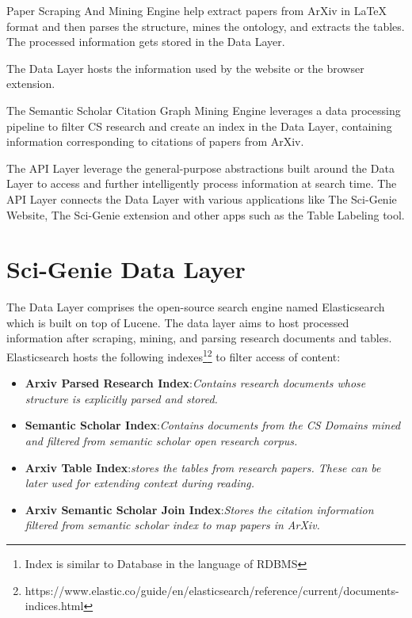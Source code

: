 Paper Scraping And Mining Engine help extract papers from ArXiv in LaTeX format and then parses the structure, mines the ontology, and extracts the tables. The processed information gets stored in the Data Layer. 

The Data Layer hosts the information used by the website or the browser extension. 

The Semantic Scholar Citation Graph Mining Engine leverages a data processing pipeline to filter CS research and create an index in the Data Layer, containing information corresponding to citations of papers from ArXiv. 

The API Layer leverage the general-purpose abstractions built around the Data Layer to access and further intelligently process information at search time. The API Layer connects the Data Layer with various applications like The Sci-Genie Website, The Sci-Genie extension and other apps such as the Table Labeling tool. 

\section{Sci-Genie Data Layer}
\label{sci-genie-core:data-layer}
The Data Layer comprises the open-source search engine named Elasticsearch\parencite{gormley2015elasticsearch} which is built on top of Lucene. 
The data layer aims to host processed information after scraping, mining, and parsing research documents and tables. 
Elasticsearch hosts the following indexes\footnote{Index is similar to Database in the language of RDBMS}\footnote{https://www.elastic.co/guide/en/elasticsearch/reference/current/documents-indices.html} to filter access of content:
\begin{itemize}
    \item \textbf{Arxiv Parsed Research Index}:\textit{Contains research documents whose structure is explicitly parsed and stored.}
    \item \textbf{Semantic Scholar Index}:\textit{Contains documents from the CS Domains mined and filtered from semantic scholar open research corpus.}
    \item \textbf{Arxiv Table Index}:\textit{stores the tables from research papers. These can be later used for extending context during reading.}
    \item \textbf{Arxiv Semantic Scholar Join Index}:\textit{Stores the citation information filtered from semantic scholar index to map papers in ArXiv.} 
\end{itemize} 

